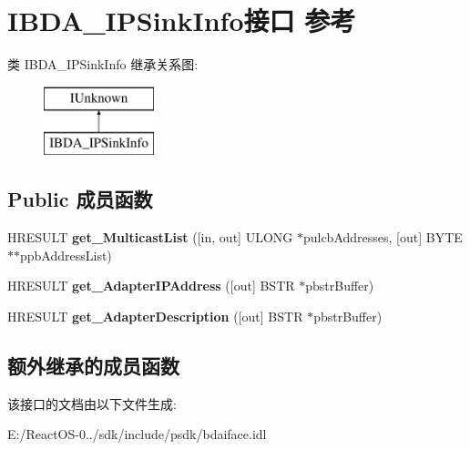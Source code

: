 \hypertarget{interface_i_b_d_a___i_p_sink_info}{}\section{I\+B\+D\+A\+\_\+\+I\+P\+Sink\+Info接口 参考}
\label{interface_i_b_d_a___i_p_sink_info}
类 I\+B\+D\+A\+\_\+\+I\+P\+Sink\+Info 继承关系图\+:\begin{figure}[H]
\begin{center}
\leavevmode
\includegraphics[height=2.000000cm]{interface_i_b_d_a___i_p_sink_info}
\end{center}
\end{figure}
\subsection*{Public 成员函数}
\begin{DoxyCompactItemize}
\item 
\mbox{\label{interface_i_b_d_a___i_p_sink_info_a624cdcd86866da5c1b074a9532af16ab}} 
H\+R\+E\+S\+U\+LT {\bfseries get\+\_\+\+Multicast\+List} (\mbox{[}in, out\mbox{]} U\+L\+O\+NG $\ast$pulcb\+Addresses, \mbox{[}out\mbox{]} B\+Y\+TE $\ast$$\ast$ppb\+Address\+List)
\item 
\mbox{\label{interface_i_b_d_a___i_p_sink_info_a6e3a932cdbfc8ef28c323726bbbc11e3}} 
H\+R\+E\+S\+U\+LT {\bfseries get\+\_\+\+Adapter\+I\+P\+Address} (\mbox{[}out\mbox{]} B\+S\+TR $\ast$pbstr\+Buffer)
\item 
\mbox{\label{interface_i_b_d_a___i_p_sink_info_a6e72fe2489ec22d509b5faf3b154cb0e}} 
H\+R\+E\+S\+U\+LT {\bfseries get\+\_\+\+Adapter\+Description} (\mbox{[}out\mbox{]} B\+S\+TR $\ast$pbstr\+Buffer)
\end{DoxyCompactItemize}
\subsection*{额外继承的成员函数}


该接口的文档由以下文件生成\+:\begin{DoxyCompactItemize}
\item 
E\+:/\+React\+O\+S-\/0../sdk/include/psdk/bdaiface.\+idl\end{DoxyCompactItemize}
